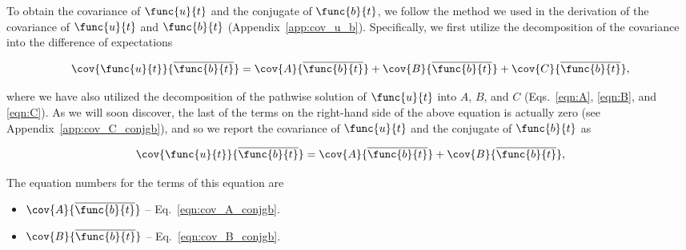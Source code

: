 To obtain the covariance of $\func{u}{t}$ and the conjugate of $\func{b}{t}$, we follow the method we used in the derivation of the covariance of $\func{u}{t}$ and $\func{b}{t}$ (Appendix~\ref{app:cov_u_b}). Specifically, we first utilize the decomposition of the covariance into the difference of expectations

\begin{equation}
    \cov{\func{u}{t}}{\overline{\func{b}{t}}} = \cov{A}{\overline{\func{b}{t}}} + \cov{B}{\overline{\func{b}{t}}} + \cov{C}{\overline{\func{b}{t}}},
\end{equation}

where we have also utilized the decomposition of the pathwise solution of $\func{u}{t}$ into $A$, $B$, and $C$ (Eqs.~\ref{eqn:A}, \ref{eqn:B}, and \ref{eqn:C}). As we will soon discover, the last of the terms on the right-hand side of the above equation is actually zero (see Appendix~\ref{app:cov_C_conjgb}), and so we report the covariance of $\func{u}{t}$ and the conjugate of $\func{b}{t}$ as 

\begin{equation}
    \cov{\func{u}{t}}{\overline{\func{b}{t}}} = \cov{A}{\overline{\func{b}{t}}} + \cov{B}{\overline{\func{b}{t}}},
    \label{eqn:cov_u_conjgb}
\end{equation}

The equation numbers for the terms of this equation are 

\begin{itemize}
	\item [] $\cov{A}{\overline{\func{b}{t}}}$ -- Eq.~\ref{eqn:cov_A_conjgb}.
	\item [] $\cov{B}{\overline{\func{b}{t}}}$ -- Eq.~\ref{eqn:cov_B_conjgb}.
\end{itemize}